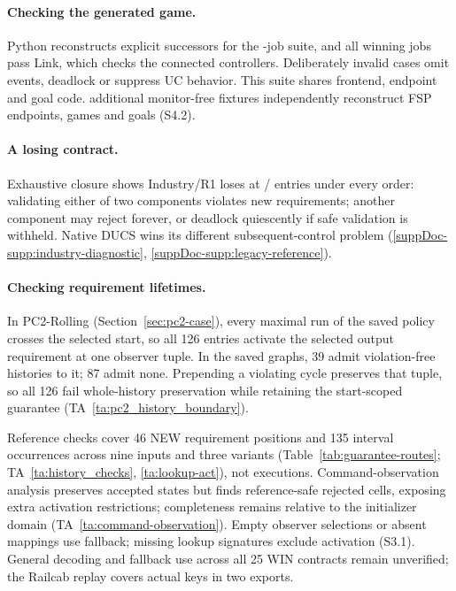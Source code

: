 \documentclass[acmsmall,screen,review,anonymous]{acmart}
\begin{document}
\paragraph{Checking the generated game.}\label{tab:validation-scope}
Python reconstructs explicit successors for the \FixedRQOneJobs{}-job suite, and all winning jobs pass Link, which checks the connected controllers. Deliberately invalid cases omit events, deadlock or suppress UC behavior. This suite shares frontend, endpoint and goal code. \FixedTargetQuiescenceFixturesWord{} additional monitor-free fixtures independently reconstruct FSP endpoints, games and goals (S4.2).

\paragraph{A losing contract.}
Exhaustive closure shows Industry/R1 loses at \FixedIndustryLosingEntries{}/\FixedIndustryEntries{} entries under every order: validating either of two components violates new requirements; another component may reject forever, or deadlock quiescently if safe validation is withheld. Native DUCS wins its different subsequent-control problem (\ref{suppDoc-supp:industry-diagnostic}, \ref{suppDoc-supp:legacy-reference}).



\paragraph{Checking requirement lifetimes.}
In PC2-Rolling (Section~\ref{sec:pc2-case}), every maximal run of the saved policy crosses the selected start, so all 126 entries activate the selected output requirement at one observer tuple. In the saved graphs, 39 admit violation-free histories to it; 87 admit none. Prepending a violating cycle preserves that tuple, so all 126 fail whole-history preservation while retaining the start-scoped guarantee (TA~\ref{ta:pc2_history_boundary}).

Reference checks cover 46 NEW requirement positions and 135 interval occurrences across nine inputs and three variants (Table~\ref{tab:guarantee-routes}; TA~\ref{ta:history_checks}, \ref{ta:lookup-act}), not executions. Command-observation analysis preserves accepted states but finds reference-safe rejected cells, exposing extra activation restrictions; completeness remains relative to the initializer domain (TA~\ref{ta:command-observation}). Empty observer selections or absent mappings use fallback; missing lookup signatures exclude activation (S3.1). General decoding and fallback use across all 25 WIN contracts remain unverified; the Railcab replay covers actual keys in two exports.
\end{document}

